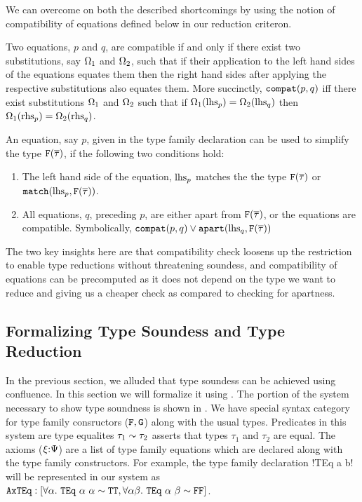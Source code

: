 \documentclass[format=acmsmall,manuscript,review,screen,nonacm,margin=1in,11pt]{acmart}
\begin{document}
We can overcome on both the described shortcomings by using the notion of compatibility of equations defined below in
our reduction criteron.
\begin{defn}\label{def:compact-eqns}
  Two equations, $p$ and $q$, are compatible   if and only if there exist two substitutions,
  say $\Omega_1$ and $\Omega_2$, such that if their application to the left hand sides of the equations
  equates them then the right hand sides after applying the respective substitutions also equates them.
  More succinctly, $\texttt{compat}(p, q)$ iff there exist substitutions $\Omega_1$ and $\Omega_2 $
  such that if $\Omega_1(\text{lhs}_{p}) = \Omega_2(\text{lhs}_{q})$ then $\Omega_1(\text{rhs}_{p}) = \Omega_2(\text{rhs}_{q})$.
\end{defn}
\begin{defn}\label{def:cft-simpl}
  An equation, say $p$, given in the type family declaration can be used to simplify the type
  $\texttt{F}(\overline{\tau})$, if the following two conditions hold:
  \begin{enumerate}
  \item The left hand side of the equation, $\text{lhs}_{p}$  matches the the type $\texttt{F}(\overline{\tau})$
    or $\texttt{match}(\text{lhs}_{p}, \texttt{F}(\overline{\tau}))$.
  \item All equations, $q$, preceding $p$, are either apart from $\texttt{F}(\overline{\tau})$, or
    the equations are compatible. Symbolically, $\texttt{compat}(p, q) \lor \texttt{apart}(\text{lhs}_{q}, \texttt{F}(\overline{\tau}))$
  \end{enumerate}
\end{defn}
The two key insights here are that compatibility check loosens up the restriction
to enable type reductions without threatening soundess, and compatibility of equations
can be precomputed as it does not depend on the type we want to reduce and giving us a cheaper check
as compared to checking for apartness.

\subsection{Formalizing Type Soundess and Type Reduction}\label{subsec:tf-closed-formal}
In the previous section, we alluded that type soundess can be achieved using
confluence. In this section we will formalize it using \CLTF. The portion of the system necessary
to show type soundness is shown in . We have special syntax category for
type family consructors ($\texttt{F},\texttt{G}$) along with the usual types. Predicates in this system
are type equalites $\tau_1\mathrel{\sim} \tau_2$ asserts that types $\tau_1$ and $\tau_2$ are equal.
The axioms ($\xi{:}\Psi$) are a list of type family equations which are declared
along with the type family constructors. For example, the type family declaration !TEq a b! will
be represented in our system as
$\texttt{AxTEq}: [\forall\alpha.~{\texttt{TEq}~\alpha~\alpha} \mathrel{\sim} \texttt{TT} , \forall\alpha\beta.~{\texttt{TEq}~\alpha~\beta} \mathrel{\sim} \texttt{FF}]$.
\end{document}
